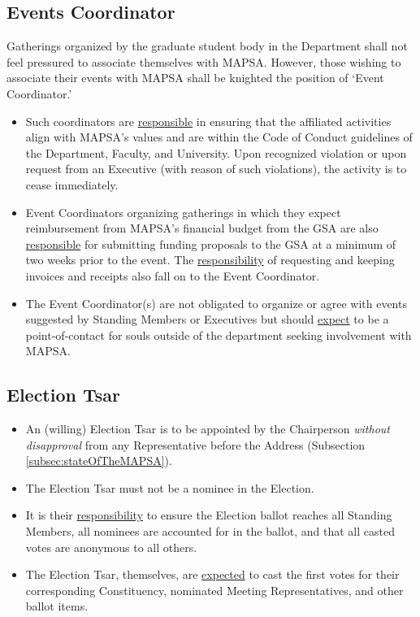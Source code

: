 \documentclass[8pt]{article}
\begin{document}
	\subsection{Events Coordinator}
	Gatherings organized by the graduate student body in the Department shall not feel pressured to associate themselves with MAPSA. However, those wishing to associate their events with MAPSA shall be knighted the position of `Event Coordinator.'
	\begin{itemize}
	\item Such coordinators are \underline{responsible} in ensuring that the affiliated activities align with MAPSA's values and are within the Code of Conduct guidelines of the Department, Faculty, and University. Upon recognized violation or upon request from an Executive (with reason of such violations), the activity is to cease immediately.
	\item Event Coordinators organizing gatherings in which they expect reimbursement from MAPSA's financial budget from the GSA are also \underline{responsible} for submitting funding proposals to the GSA at a minimum of two weeks prior to the event. The \underline{responsibility} of requesting and keeping invoices and receipts also fall on to the Event Coordinator.
	\item The Event Coordinator(s) are not obligated to organize or agree with events suggested by Standing Members or Executives but should \underline{expect} to be a point-of-contact for souls outside of the department seeking involvement with MAPSA.
	\end{itemize}
	\subsection{Election Tsar}
	\begin{itemize}
	\item An (willing) Election Tsar is to be appointed by the Chairperson \textit{without disapproval} from any Representative before the Address (Subsection \ref{subsec:stateOfTheMAPSA}).
	\item The Election Tsar must not be a nominee in the Election.
	\item It is their \underline{responsibility} to ensure the Election ballot reaches all Standing Members, all nominees are accounted for in the ballot, and that all casted votes are anonymous to all others.
	\item The Election Tsar, themselves, are \underline{expected} to cast the first votes for their corresponding Constituency, nominated Meeting Representatives, and other ballot items.
	\end{itemize}
\end{document}
